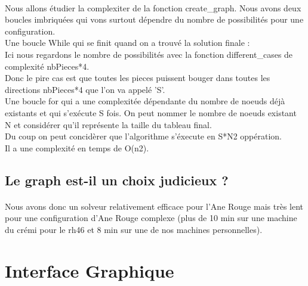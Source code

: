 \documentclass {article}
\begin{document}
\paragraph{}
Nous allons étudier la complexiter de la fonction create\_graph. Nous avons deux boucles imbriquées qui vons surtout dépendre du nombre de possibilités pour une configuration.\\
Une boucle While qui se finit quand on a trouvé la solution finale :\\
Ici nous regardons le nombre de possibilités avec la fonction different\_cases de complexité nbPieces*4.\\
Donc le pire cas est que toutes les pieces puissent bouger dans toutes les directions nbPieces*4 que l'on va appelé 'S'.\\
Une boucle for qui a une complexitée dépendante du nombre de noeuds déjà existants et qui s'exécute S fois. On peut nommer le nombre de noeuds existant N et considérer qu'il représente la taille du tableau final.\\
Du coup on peut concidèrer que l'algorithme s'éxecute en S*N2 oppération.\\
Il a une complexité en temps de O(n2).


\subsection{Le graph est-il un choix judicieux ?}
\paragraph{}
Nous avons donc un solveur relativement efficace pour l'Ane Rouge mais très lent pour une configuration d'Ane Rouge complexe (plus de 10 min sur une machine du crémi pour le rh46 et 8 min sur une de nos machines personnelles).

\section{Interface Graphique}
\paragraph{}
\end{document}
